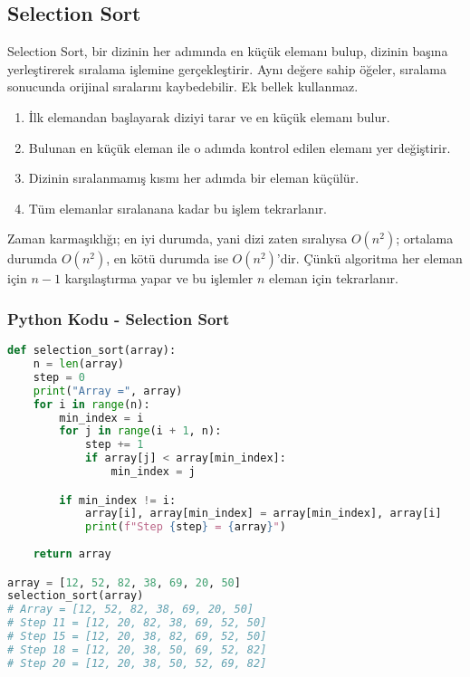 \newpage

\subsection{Selection Sort}

Selection Sort, bir dizinin her adımında en küçük elemanı bulup, dizinin başına yerleştirerek sıralama işlemine gerçekleştirir. Aynı değere sahip öğeler, sıralama sonucunda orijinal sıralarını kaybedebilir. Ek bellek kullanmaz.

\begin{enumerate}
    \item İlk elemandan başlayarak diziyi tarar ve en küçük elemanı bulur.
    \item Bulunan en küçük eleman ile o adımda kontrol edilen elemanı yer değiştirir.
    \item Dizinin sıralanmamış kısmı her adımda bir eleman küçülür.
    \item Tüm elemanlar sıralanana kadar bu işlem tekrarlanır.
\end{enumerate}

Zaman karmaşıklığı; en iyi durumda, yani dizi zaten sıralıysa $O(n^2)$; ortalama durumda $O(n^2)$, en kötü durumda ise $O(n^2)$'dir. Çünkü algoritma her eleman için $n-1$ karşılaştırma yapar ve bu işlemler $n$ eleman için tekrarlanır.

\subsubsection{Python Kodu - Selection Sort}

\begin{lstlisting}[language=Python]
def selection_sort(array):
    n = len(array)
    step = 0
    print("Array =", array)
    for i in range(n):
        min_index = i
        for j in range(i + 1, n):
            step += 1   
            if array[j] < array[min_index]:
                min_index = j

        if min_index != i:
            array[i], array[min_index] = array[min_index], array[i]
            print(f"Step {step} = {array}")
    
    return array

array = [12, 52, 82, 38, 69, 20, 50]
selection_sort(array)
# Array = [12, 52, 82, 38, 69, 20, 50]
# Step 11 = [12, 20, 82, 38, 69, 52, 50]
# Step 15 = [12, 20, 38, 82, 69, 52, 50]
# Step 18 = [12, 20, 38, 50, 69, 52, 82]
# Step 20 = [12, 20, 38, 50, 52, 69, 82]
\end{lstlisting}

